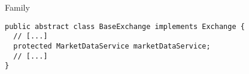 \begin{pattern}{Family}
\begin{verbatim}
public abstract class BaseExchange implements Exchange {
  // [...]
  protected MarketDataService marketDataService;
  // [...]
}
\end{verbatim}

\detection{}

\discussion{}
\cite{ernstFamilyPolymorphism2001}

\related{}

\end{pattern}